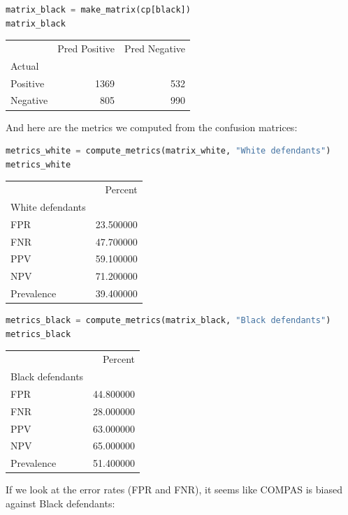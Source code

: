 \begin{lstlisting}[language=Python,style=source]
matrix_black = make_matrix(cp[black])
matrix_black
\end{lstlisting}

\begin{tabular}{lrr}
\midrule
 & Pred Positive & Pred Negative \\
Actual &  &  \\
\midrule
Positive & 1369 & 532 \\
Negative & 805 & 990 \\
\midrule
\end{tabular}

And here are the metrics we computed from the confusion matrices:

\begin{lstlisting}[language=Python,style=source]
metrics_white = compute_metrics(matrix_white, "White defendants")
metrics_white
\end{lstlisting}

\begin{tabular}{lr}
\midrule
 & Percent \\
White defendants &  \\
\midrule
FPR & 23.500000 \\
FNR & 47.700000 \\
PPV & 59.100000 \\
NPV & 71.200000 \\
Prevalence & 39.400000 \\
\midrule
\end{tabular}

\begin{lstlisting}[language=Python,style=source]
metrics_black = compute_metrics(matrix_black, "Black defendants")
metrics_black
\end{lstlisting}

\begin{tabular}{lr}
\midrule
 & Percent \\
Black defendants &  \\
\midrule
FPR & 44.800000 \\
FNR & 28.000000 \\
PPV & 63.000000 \\
NPV & 65.000000 \\
Prevalence & 51.400000 \\
\midrule
\end{tabular}

If we look at the error rates (FPR and FNR), it seems like COMPAS is
biased against Black defendants:

